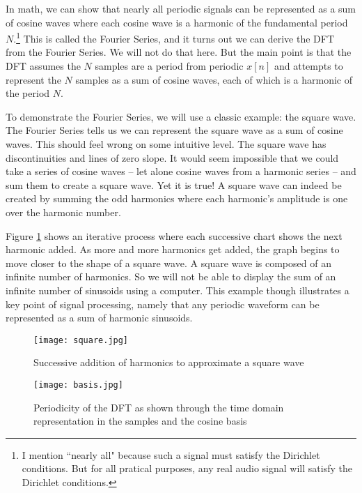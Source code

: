 In math, we can show that nearly all periodic signals can be
represented as a sum of cosine waves where each cosine wave is a harmonic of the fundamental period $N$.\footnote{I
mention ``nearly all" because such a signal must satisfy the Dirichlet conditions.  But for all pratical purposes, any
real audio signal will satisfy the Dirichlet conditions.}  
This is called the Fourier Series, and it turns out we can derive the DFT from the Fourier Series.  We will not
do that here.  But the main point is that the DFT assumes the $N$ samples are a period from periodic $x[n]$ and 
attempts to
represent the $N$ samples as a sum of cosine waves, each of which is a harmonic of the period $N$.  

To demonstrate the Fourier Series, we will use a classic example: the square wave.  The Fourier Series tells us we
can represent the square wave as a sum of cosine waves.  This should feel wrong on some intuitive level.  The
square wave has discontinuities and lines of zero slope.  It would seem impossible that we could take a series of
cosine waves -- let alone cosine waves from a harmonic series -- and sum them to create a square wave.  Yet it is 
true!  A square
wave can indeed be created by summing the odd harmonics where each harmonic's amplitude is one over 
the harmonic number.

Figure \ref{fig:square} shows an iterative process where each successive chart shows the next harmonic 
added.  As more and more harmonics get added, the graph begins to move closer to the shape of a square wave.  A
square wave is composed of an infinite number of harmonics.  So we will not be able to display the sum of an infinite
number of sinusoids using a computer.  This example though illustrates a key point of signal processing, namely that any
periodic waveform can be represented as a sum of harmonic sinusoids.  

\begin{figure}[h]
	\caption{Successive addition of harmonics to approximate a square wave}
	\label{fig:square}
	\begin{center}
		\texttt{[image: square.jpg]}
	\end{center}
\end{figure}

\begin{figure}[h]
	\caption{Periodicity of the DFT as shown through the time domain representation in the samples and the cosine basis}
	\label{fig:basis}
	\begin{center}
		\texttt{[image: basis.jpg]}
	\end{center}
\end{figure}

